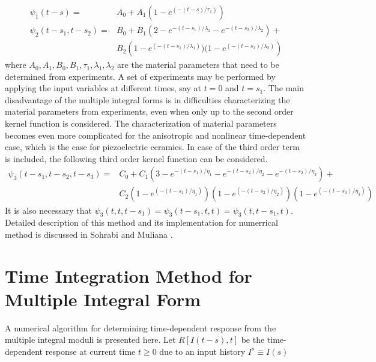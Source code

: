 \begin{equation}
\begin{aligned}
 \psi_1(t-s)=& A_0+A_1 (1-e^{(-(t-s)/\tau_1)}) \\ 
 \psi_2(t-s_1,t-s_2) = & B_0+B_1 
\left(2-e^{-(t-s_1)/\lambda_1}-e^{-(t-s_2)/\lambda_2}\right)+ \\
& B_2\left(1-e^{(-(t-s_1)/\lambda_1)})(1-e^{(-(t-s_2)/\lambda_2)}\right)  
\end{aligned}
\label{EQN:double_integral_sample_second}
\end{equation}
where $A_0, A_1, B_0, B_1, \tau_1, \lambda_1, \lambda_2$ are the material parameters that need to be determined from experiments.
A set of experiments may be performed by applying the input variables at different times, say at $t=0$ and $t=s_1$.
The main disadvantage of the multiple integral forms is in difficulties characterizing the material parameters from experiments,
 even when only up to the second order kernel function is considered. 
The characterization of material parameters becomes even more complicated for the anisotropic and nonlinear time-dependent case,
 which is the case for piezoelectric ceramics. 
 In case of the third order term is included, the following third order kernel function can be considered.
\begin{equation}
\begin{aligned}
 \psi_3(t-s_1,t-s_2,t-s_3) = & C_0+C_1 
\left(3-e^{-(t-s_1)/\eta_1}-e^{-(t-s_2)/\eta_2}-e^{-(t-s_2)/\eta_3}\right)+ \\
& C_2\left(1-e^{(-(t-s_1)/\eta_1)}\right)  
     \left(1-e^{(-(t-s_2)/\eta_2)}\right)
     \left(1-e^{(-(t-s_3)/\eta_3)}\right)
\end{aligned}
\label{EQN:double_integral_sample_third_order}
\end{equation}
It is also necessary that  $\psi_3(t,t,t-s_1)=\psi_3(t-s_1,t,t)= \psi_3(t,t-s_1,t)$.
Detailed description of this method and its implementation for numerrical method is discussed in Sohrabi and Muliana \cite{Sohrabi2011}.


\section{Time Integration Method for Multiple Integral Form}
A numerical algorithm for determining time-dependent response from the multiple integral moduli is presented here. 
Let $R \left[ I(t-s),t \right] $ be the time-dependent response at current time $t \geq 0  $ due to an input history $I^s \equiv I(s) $

